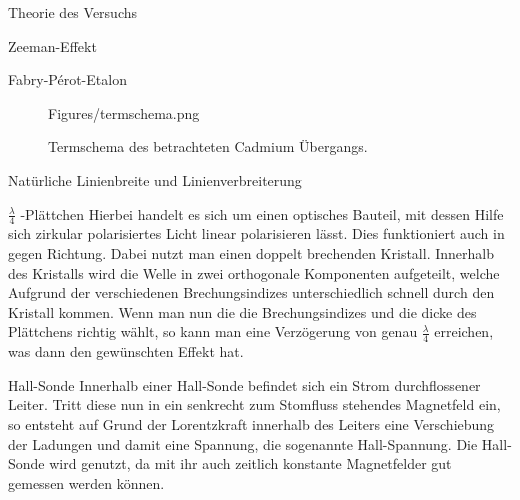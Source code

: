 \documentclass[pdftex, a4paper,11pt, twoside, ngerman]{report}
\begin{document}
\begin{chapter}{Theorie des Versuchs}
\begin{section}{Zeeman-Effekt}
\begin{subsection}{Fabry-Pérot-Etalon}
\begin{figure}[b!]
\begin{minipage}{0.48\textwidth}
                {Figures/termschema.png}
                \caption{Termschema des betrachteten Cadmium Übergangs.}
            \label{fig:termschema}
          \end{minipage}
        \end{figure}
      \end{subsection}
      
      
      
      \begin{subsection}{Natürliche Linienbreite und Linienverbreiterung}
        
        
      \end{subsection}
      
      
      
      \begin{subsection}{$\frac{\lambda}{4}$ -Plättchen}
        Hierbei handelt es sich um einen optisches Bauteil, mit dessen Hilfe
        sich zirkular polarisiertes Licht linear polarisieren lässt. Dies
        funktioniert auch in gegen Richtung. Dabei nutzt man einen doppelt
        brechenden Kristall. Innerhalb des Kristalls wird die Welle in zwei
        orthogonale Komponenten aufgeteilt, welche Aufgrund der verschiedenen
        Brechungsindizes unterschiedlich schnell durch den Kristall kommen.
        Wenn man nun die die Brechungsindizes und die dicke des Plättchens
        richtig wählt, so kann man eine Verzögerung von genau $\frac \lambda 4$
        erreichen, was dann den gewünschten Effekt hat.
        
      \end{subsection}
      
      
      
      \begin{subsection}{Hall-Sonde}
        Innerhalb einer Hall-Sonde befindet sich ein Strom durchflossener
        Leiter. Tritt diese nun in ein senkrecht zum Stomfluss stehendes
        Magnetfeld ein, so entsteht auf Grund der Lorentzkraft innerhalb des
        Leiters eine Verschiebung der Ladungen und damit eine Spannung, die
        sogenannte Hall-Spannung. Die Hall-Sonde wird genutzt, da mit ihr auch
        zeitlich konstante Magnetfelder gut gemessen werden können.
        

\end{subsection}
\end{section}
\end{chapter}
\end{document}
